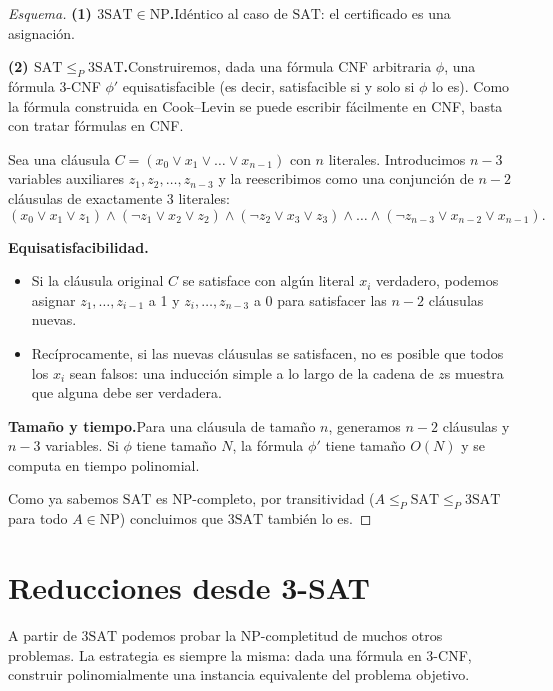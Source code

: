 \documentclass[11pt,a4paper]{article}
\theoremstyle{definicion}
\newcommand{\redP}{\leq_{P}}
\newcommand{\NP}{\mathrm{NP}}
\begin{document}
\begin{proof}[Esquema]
\textbf{(1) $3\mathrm{SAT} \in \NP$.}\quad Idéntico al caso de $\mathrm{SAT}$: el certificado es una asignación.

\textbf{(2) $\mathrm{SAT} \redP 3\mathrm{SAT}$.}\quad Construiremos, dada una fórmula CNF arbitraria $\phi$, una fórmula 3-CNF $\phi'$ equisatisfacible (es decir, satisfacible si y solo si $\phi$ lo es). Como la fórmula construida en Cook--Levin se puede escribir fácilmente en CNF, basta con tratar fórmulas en CNF.

Sea una cláusula $C = (x_0 \lor x_1 \lor \dots \lor x_{n-1})$ con $n$ literales. Introducimos $n - 3$ variables auxiliares $z_1, z_2, \dots, z_{n-3}$ y la reescribimos como una conjunción de $n - 2$ cláusulas de exactamente 3 literales:
\[
(x_0 \lor x_1 \lor z_1) \land (\neg z_1 \lor x_2 \lor z_2) \land (\neg z_2 \lor x_3 \lor z_3) \land \dots \land (\neg z_{n-3} \lor x_{n-2} \lor x_{n-1}).
\]

\textbf{Equisatisfacibilidad.}\quad
\begin{itemize}
    \item Si la cláusula original $C$ se satisface con algún literal $x_i$ verdadero, podemos asignar $z_1, \dots, z_{i-1}$ a 1 y $z_i, \dots, z_{n-3}$ a 0 para satisfacer las $n - 2$ cláusulas nuevas.
    \item Recíprocamente, si las nuevas cláusulas se satisfacen, no es posible que todos los $x_i$ sean falsos: una inducción simple a lo largo de la cadena de $z$s muestra que alguna debe ser verdadera.
\end{itemize}

\textbf{Tamaño y tiempo.}\quad Para una cláusula de tamaño $n$, generamos $n - 2$ cláusulas y $n - 3$ variables. Si $\phi$ tiene tamaño $N$, la fórmula $\phi'$ tiene tamaño $O(N)$ y se computa en tiempo polinomial.

Como ya sabemos $\mathrm{SAT}$ es NP-completo, por transitividad ($A \redP \mathrm{SAT} \redP 3\mathrm{SAT}$ para todo $A \in \NP$) concluimos que $3\mathrm{SAT}$ también lo es.
\end{proof}

\section{Reducciones desde 3-SAT}

A partir de $3\mathrm{SAT}$ podemos probar la NP-completitud de muchos otros problemas. La estrategia es siempre la misma: dada una fórmula en 3-CNF, construir polinomialmente una instancia equivalente del problema objetivo.
\end{document}
